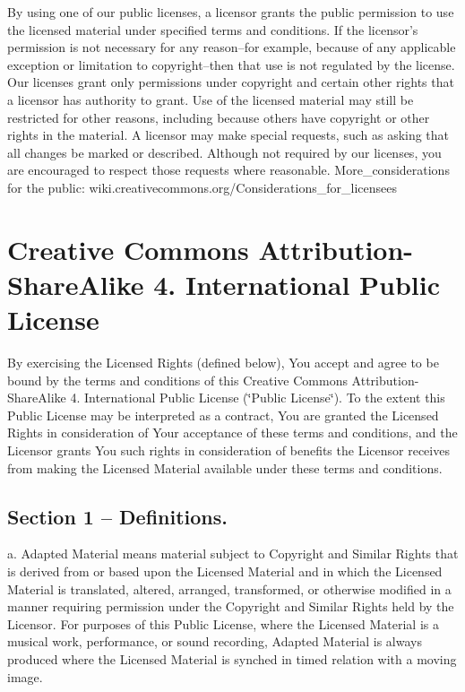 By using one of our public licenses, a licensor grants the public permission to use the licensed material under specified terms and conditions. If the licensor’s permission is not necessary for any reason–for example, because of any applicable exception or limitation to copyright–then that use is not regulated by the license. Our licenses grant only permissions under copyright and certain other rights that a licensor has authority to grant. Use of the licensed material may still be restricted for other reasons, including because others have copyright or other rights in the material. A licensor may make special requests, such as asking that all changes be marked or described. Although not required by our licenses, you are encouraged to respect those requests where reasonable. More\+\_\+considerations for the public\+: wiki.\+creativecommons.\+org/\+Considerations\+\_\+for\+\_\+licensees 



\section*{Creative Commons Attribution-\/\+Share\+Alike 4. International Public License}

By exercising the Licensed Rights (defined below), You accept and agree to be bound by the terms and conditions of this Creative Commons Attribution-\/\+Share\+Alike 4. International Public License (\char`\"{}\+Public
\+License\char`\"{}). To the extent this Public License may be interpreted as a contract, You are granted the Licensed Rights in consideration of Your acceptance of these terms and conditions, and the Licensor grants You such rights in consideration of benefits the Licensor receives from making the Licensed Material available under these terms and conditions.

\subsection*{Section 1 -- Definitions.}

a. Adapted Material means material subject to Copyright and Similar Rights that is derived from or based upon the Licensed Material and in which the Licensed Material is translated, altered, arranged, transformed, or otherwise modified in a manner requiring permission under the Copyright and Similar Rights held by the Licensor. For purposes of this Public License, where the Licensed Material is a musical work, performance, or sound recording, Adapted Material is always produced where the Licensed Material is synched in timed relation with a moving image.

